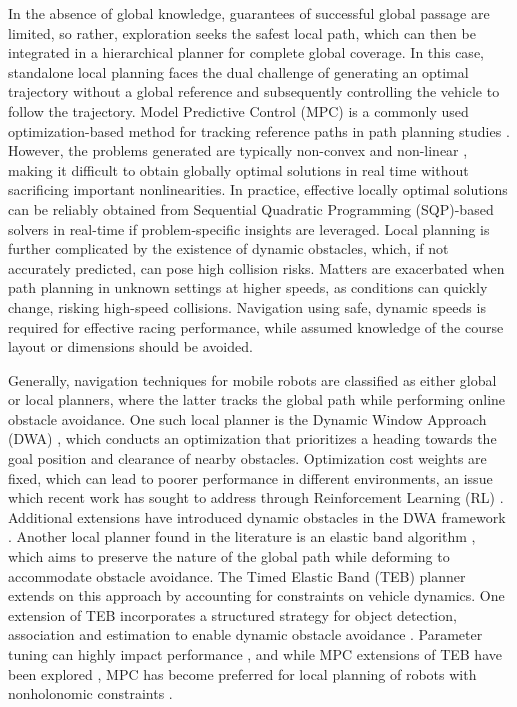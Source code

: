 \documentclass[journal]{IEEEtran}
\begin{document}
In the absence of global knowledge, guarantees of successful global passage are limited, so rather, exploration seeks the safest local path, which can then be integrated in a hierarchical planner for complete global coverage. In this case, standalone local planning faces the dual challenge of generating an optimal trajectory without a global reference and subsequently controlling the vehicle to follow the trajectory. Model Predictive Control (MPC) is a commonly used optimization-based method for tracking reference paths in path planning studies \cite{Yu2021}. However, the problems generated are typically non-convex and non-linear \cite{Weiskircher2017,MPC_Planner}, making it difficult to obtain globally optimal solutions in real time without sacrificing important nonlinearities. In practice, effective locally optimal solutions can be reliably obtained from Sequential Quadratic Programming (SQP)-based solvers \cite{Lim2018,Sabiha22} in real-time if problem-specific insights are leveraged. Local planning is further complicated by the existence of dynamic obstacles, which, if not accurately predicted, can pose high collision risks. Matters are exacerbated when path planning in unknown settings at higher speeds, as conditions can quickly change, risking high-speed collisions. Navigation using safe, dynamic speeds is required for effective racing performance, while assumed knowledge of the course layout or dimensions \cite{Evans24} should be avoided.
\IEEEpubidadjcol
 

Generally, navigation techniques for mobile robots are classified as either global or local planners, where the latter tracks the global path while performing online obstacle avoidance. One such local planner is the Dynamic Window Approach (DWA) \cite{DWA}, which conducts an optimization that prioritizes a heading towards the goal position and clearance of nearby obstacles. Optimization cost weights are fixed, which can lead to poorer performance in different environments, an issue which recent work has sought to address through Reinforcement Learning (RL) \cite{Dobrevski2024}. Additional extensions have introduced dynamic obstacles in the DWA framework \cite{Molinos2019}. Another local planner found in the literature is an elastic band algorithm \cite{EB}, which aims to preserve the nature of the global path while deforming to accommodate obstacle avoidance. The Timed Elastic Band (TEB) planner \cite{TEB} extends on this approach by accounting for constraints on vehicle dynamics. One extension of TEB incorporates a structured strategy for object detection, association and estimation to enable dynamic obstacle avoidance \cite{Dong21}. Parameter tuning can highly impact performance \cite{Yuan2022}, and while MPC extensions of TEB have been explored \cite{Rosmann2015}, MPC has become preferred for local planning of robots with nonholonomic constraints \cite{MPC_Planner}.
\end{document}
